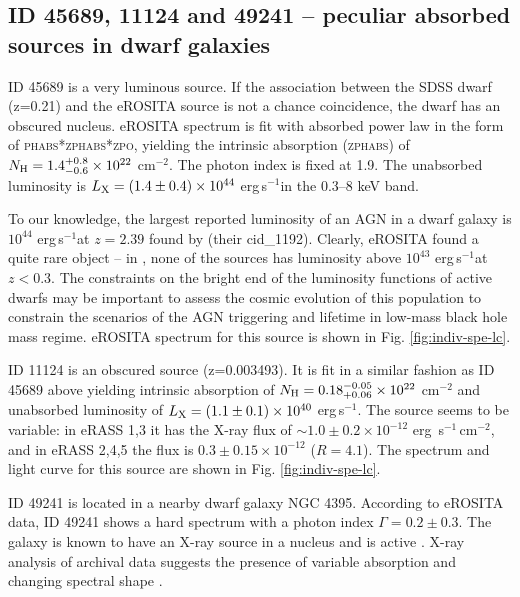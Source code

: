 \documentclass[fleqn,usenatbib]{mnras}
\newcommand{\ergps}{erg\,s$^{-1}$}
\newcommand{\ergpspcm}{erg \,s$^{-1}$\,cm$^{-2}$}
\begin{document}
\subsection{ID 45689,  11124 and 49241 -- peculiar absorbed sources in dwarf galaxies}
\label{sect:indiv:obscured_dwarf}

ID 45689 is a very luminous source. If the association between the SDSS dwarf  (z=0.21) and the eROSITA source is not a chance coincidence,  the dwarf has an obscured nucleus. eROSITA spectrum is fit with absorbed power law in the form of \textsc{phabs*zphabs*zpo}, yielding the intrinsic absorption (\textsc{zphabs}) of $N_{\rm H}=1.4^{+0.8}_{-0.6}\times10^{22}$ cm$^{-2}$. The photon index is fixed at 1.9. The unabsorbed luminosity is $L_{\rm X}=(1.4\pm0.4)\times 10^{44}$ \ergps in the 0.3--8 keV band.  

To our knowledge, the largest reported luminosity of an AGN in a dwarf galaxy is  $10^{44}$ \ergps at $z=2.39$ found by \citealt{Mezcua2018} (their cid\_1192). Clearly, eROSITA found a quite rare object -- in \citealt{Mezcua2018, Zou2023}, none of the sources has luminosity above $10^{43}$ \ergps at $z<0.3$. The constraints on the bright end of the luminosity functions of active dwarfs may be important to assess the cosmic evolution of this population to constrain the scenarios of the AGN triggering and lifetime in low-mass black hole mass regime.  eROSITA spectrum for this source is shown in Fig. \ref{fig:indiv-spe-lc}.

ID 11124 is an obscured source (z=0.003493). It is fit in a similar fashion as ID 45689 above yielding intrinsic absorption of  $N_{\rm H}=0.18^{-0.05}_{+0.06}\times10^{22}$ cm$^{-2}$ and unabsorbed luminosity of $L_{\rm X}=(1.1\pm0.1)\times 10^{40}$ \ergps. The source seems to be variable:  in eRASS 1,3 it has the X-ray flux of $\sim 1.0\pm0.2\times10^{-12}$ \ergpspcm, and in eRASS 2,4,5 the flux is $0.3\pm0.15\times10^{-12}$ ($R=4.1$). The spectrum and light curve for this source are shown in Fig. \ref{fig:indiv-spe-lc}. 


ID 49241 is located in a nearby dwarf galaxy NGC 4395. According to eROSITA data, ID 49241 shows a hard spectrum with a photon index $\Gamma=0.2\pm0.3$. The galaxy is known to have an X-ray source in a nucleus and is active \citep{Moran2005, Nardini2011}. X-ray analysis of archival data suggests the presence of variable absorption and changing spectral shape \citep{Kammoun2019}. %
\end{document}

